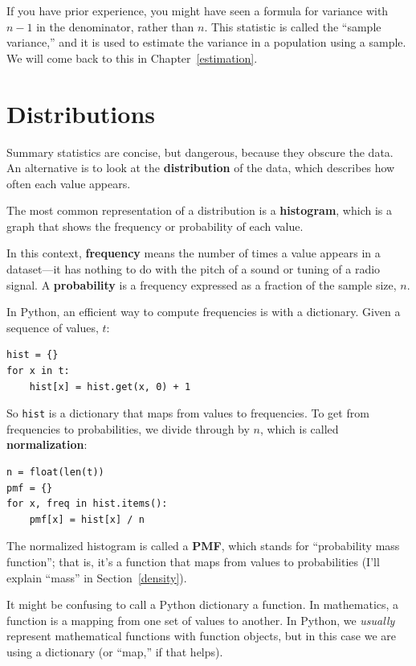 \documentclass[12pt]{book}
\begin{document}
If you have prior experience, you might have seen a 
formula for variance with $n-1$ in the denominator, rather than $n$.
This statistic is called the ``sample variance,'' and it is used
to estimate the variance in a population using a sample.  We will
come back to this in Chapter~\ref{estimation}.

\section{Distributions}
\label{distributions}

Summary statistics are concise, but dangerous, because they obscure
the data.  An alternative is to look at the {\bf distribution} of the
data, which describes how often each value appears.

The most common representation of a distribution is a {\bf histogram},
which is a graph that shows the frequency or probability
of each value.  

In this context, {\bf frequency} means the number of times a value
appears in a dataset---it has nothing to do with the pitch of a sound
or tuning of a radio signal.  A {\bf probability} is a frequency expressed
as a fraction of the sample size, $n$.

In Python, an efficient way to compute frequencies is with a dictionary.
Given a sequence of values, $t$:

\begin{verbatim}
hist = {}
for x in t:
    hist[x] = hist.get(x, 0) + 1
\end{verbatim}

So {\tt hist} is a dictionary that maps from values to frequencies.
To get from frequencies to probabilities, we divide through by $n$,
which is called {\bf normalization}:

\begin{verbatim}
n = float(len(t))
pmf = {}
for x, freq in hist.items():
    pmf[x] = hist[x] / n
\end{verbatim}

The normalized histogram is called a {\bf PMF}, which stands for
``probability mass function''; that is, it's a function that maps from
values to probabilities (I'll explain ``mass'' in
Section~\ref{density}).

It might be confusing to call a Python dictionary a function.  In
mathematics, a function is a mapping from one set of values to
another.  In Python, we {\em usually} represent mathematical functions
with function objects, but in this case we are using a dictionary
(or ``map,'' if that helps).
\end{document}
